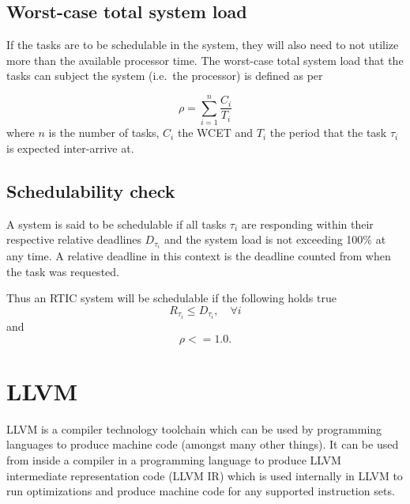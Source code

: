 \subsection{Worst-case total system load}
If the tasks are to be schedulable in the system, they will also need to not
utilize more than the available processor time. The worst-case total system
load that the tasks can subject the system (i.e.\ the processor) is defined
as per \cite{hardrealtimecomputingsystems}

\begin{equation}
    \rho = \sum^{n}_{i=1} \frac{C_i}{T_i}
\end{equation}
where $n$ is the number of tasks, $C_i$ the WCET and $T_i$ the
period that the task $\tau_i$ is expected inter-arrive at.

\subsection{Schedulability check}
A system is said to be schedulable if all tasks $\tau_i$ are responding within
their respective relative deadlines $D_{\tau_i}$ and the system load is not exceeding
100\% at any time. A relative deadline in this context is the deadline counted
from when the task was requested.

Thus an RTIC system will be schedulable if the following holds true
\begin{equation}
    R_{\tau_i} \leq D_{\tau_i}, \quad \forall i
\end{equation}
and
\begin{equation}
    \rho <= 1.0.
\end{equation}


\section{LLVM}
LLVM is a compiler technology toolchain which can be used by programming
languages to produce machine code (amongst many other things). It can be used
from inside a compiler in a programming language to produce LLVM intermediate
representation code (LLVM IR) which is used internally in LLVM to run
optimizations and produce machine code for any supported instruction sets.

